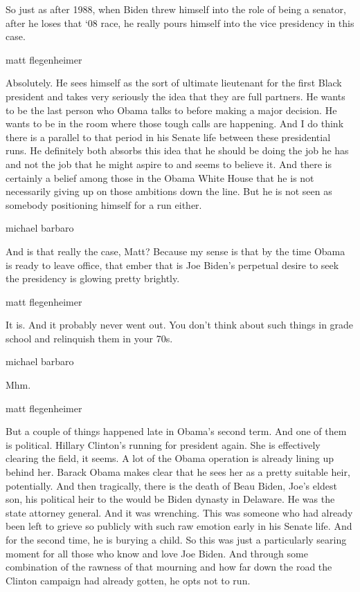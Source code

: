 So just as after 1988, when Biden threw himself into the role of being a
senator, after he loses that `08 race, he really pours himself into the
vice presidency in this case.

matt flegenheimer

Absolutely. He sees himself as the sort of ultimate lieutenant for the
first Black president and takes very seriously the idea that they are
full partners. He wants to be the last person who Obama talks to before
making a major decision. He wants to be in the room where those tough
calls are happening. And I do think there is a parallel to that period
in his Senate life between these presidential runs. He definitely both
absorbs this idea that he should be doing the job he has and not the job
that he might aspire to and seems to believe it. And there is certainly
a belief among those in the Obama White House that he is not necessarily
giving up on those ambitions down the line. But he is not seen as
somebody positioning himself for a run either.

michael barbaro

And is that really the case, Matt? Because my sense is that by the time
Obama is ready to leave office, that ember that is Joe Biden's perpetual
desire to seek the presidency is glowing pretty brightly.

matt flegenheimer

It is. And it probably never went out. You don't think about such things
in grade school and relinquish them in your 70s.

michael barbaro

Mhm.

matt flegenheimer

But a couple of things happened late in Obama's second term. And one of
them is political. Hillary Clinton's running for president again. She is
effectively clearing the field, it seems. A lot of the Obama operation
is already lining up behind her. Barack Obama makes clear that he sees
her as a pretty suitable heir, potentially. And then tragically, there
is the death of Beau Biden, Joe's eldest son, his political heir to the
would be Biden dynasty in Delaware. He was the state attorney general.
And it was wrenching. This was someone who had already been left to
grieve so publicly with such raw emotion early in his Senate life. And
for the second time, he is burying a child. So this was just a
particularly searing moment for all those who know and love Joe Biden.
And through some combination of the rawness of that mourning and how far
down the road the Clinton campaign had already gotten, he opts not to
run.

